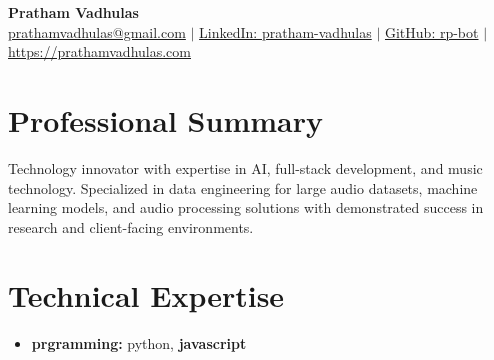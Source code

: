 \documentclass[letterpaper,11pt]{article}
\makeatletter
\newcommand{\resumeItem}[1]{
  \item\small{
    {#1 \vspace{-2pt}}
  }
}
\newcommand{\resumeSubheading}[4]{
  \item
    \begin{tabular*}{0.97\textwidth}[t]{l@{\extracolsep{\fill}}r}
      \normalsize \textbf{#1} & \scriptsize#2 \\
      \small #3  \\
    \end{tabular*}\vspace{-12pt}
}
\newcommand{\resumeSubHeadingListStart}{\begin{itemize}[leftmargin=0.15in, label={}]}
\newcommand{\resumeSubHeadingListEnd}{\end{itemize}}
\makeatother
\begin{document}

\hypersetup{urlcolor = black} %

\begin{center}
    \textbf{\LARGE Pratham Vadhulas} \\ \vspace{3pt}
    \small
     \hspace{.5pt} {\underline{prathamvadhulas@gmail.com}}
    $|$
     \hspace{.5pt} {\underline{LinkedIn: pratham-vadhulas}}
    $|$
     \hspace{.5pt} {\underline{GitHub: rp-bot}}
    $|$
 \hspace{.5pt} {\underline{https://prathamvadhulas.com}}
\end{center}
\vspace{-18pt}

\hypersetup{urlcolor = linkcolor} %

\section{Professional Summary}
Technology innovator with expertise in AI, full-stack development, and music technology. Specialized in data engineering for large audio datasets, machine learning models, and audio processing solutions with demonstrated success in research and client-facing environments.


\section{Technical Expertise}
\resumeSubHeadingListStart
  \resumeItem{
    \small{
      \textbf{prgramming:} python, \textbf{javascript}\\[-5pt]
    }
  }
\resumeSubHeadingListEnd
\vspace{-5pt}

        
      
\end{document}
